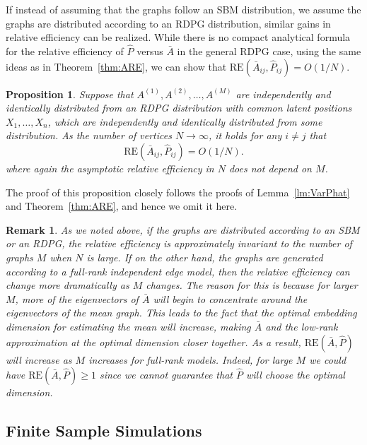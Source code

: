 \documentclass[10pt,letterpaper]{article}
\newtheorem{proposition}[fact]{Proposition}
\newtheorem{remark}[fact]{Remark}
\renewcommand{\hat}{\widehat}
\begin{document}
If instead of assuming that the graphs follow an SBM distribution, we assume the graphs are distributed according to an RDPG distribution, similar gains in relative efficiency can be realized.
While there is no compact analytical formula for the relative efficiency of $\hat{P}$ versus $\bar{A}$ in the general RDPG case, using the same ideas as in Theorem~\ref{thm:ARE}, we can show that $\mathrm{RE}(\bar{A}_{ij},\hat{P}_{ij}) = O(1/N)$.

\begin{proposition}
Suppose that $A^{(1)},A^{(2)},\dotsc,A^{(M)}$ are independently and identically distributed from an RDPG distribution with common latent positions $X_1,\dotsc,X_n$, which are independently and identically distributed from some distribution.
As the number of vertices $N\to\infty$, it holds for any $i\neq j$ that 
\[
    \mathrm{RE}(\bar{A}_{ij},\hat{P}_{ij}) = O(1/N).
\]
where again the asymptotic relative efficiency in $N$ does not depend on $M$.
\end{proposition}
The proof of this proposition closely follows the proofs of Lemma~\ref{lm:VarPhat} and Theorem~\ref{thm:ARE}, and hence we omit it here.

\begin{remark}
As we noted above, if the graphs are distributed according to an SBM or an RDPG, the relative efficiency is approximately invariant to the number of graphs $M$ when $N$ is large.
If on the other hand, the graphs are generated according to a full-rank independent edge model, then the relative efficiency can change more dramatically as $M$ changes. 
The reason for this is because for larger $M$, more of the eigenvectors of $\bar{A}$ will begin to concentrate around the eigenvectors of the mean graph.
This leads to the fact that the optimal embedding dimension for estimating the mean will increase, making $\bar{A}$ and the low-rank approximation at the optimal dimension closer together. 
As a result, $\mathrm{RE}(\bar{A},\hat{P})$ will increase as $M$ increases for full-rank models.
Indeed, for large $M$ we could have $\mathrm{RE}(\bar{A},\hat{P})\geq 1$ since we cannot guarantee that $\hat{P}$ will choose the optimal dimension.
\end{remark}

\subsection{Finite Sample Simulations}\label{sec:sbm_sim}
\end{document}
